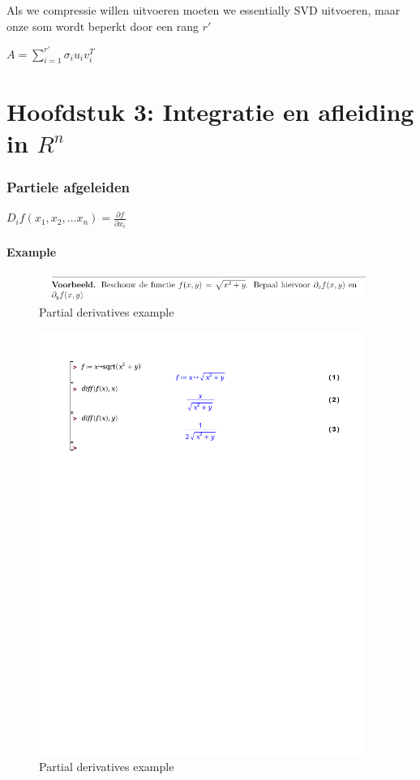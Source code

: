 \documentclass[a4paper]{report}
\begin{document}
Als we compressie willen uitvoeren moeten we essentially SVD uitvoeren, maar onze som wordt beperkt door een rang $r'$

$A = \sum_{i=1}^{r'} \sigma_i u_i v_i^T$

\chapter{Hoofdstuk 3: Integratie en afleiding in $R^n$}

\subsection{Partiele afgeleiden}

$D_i f(x_1, x_2, ... x_n) = \frac{\partial f}{\partial x_i}$

\subsubsection{Example}

\begin{figure}[H]
	\begin{center}
		\includegraphics[width=0.95\textwidth]{./images/partial.png}
	\end{center}
	\caption{Partial derivatives example}
	\label{}
\end{figure}
\begin{figure}[H]
	\begin{center}
		\includegraphics[width=0.95\textwidth]{./partial.pdf}
	\end{center}
	\caption{Partial derivatives example}
	\label{}
\end{figure}
\end{document}
